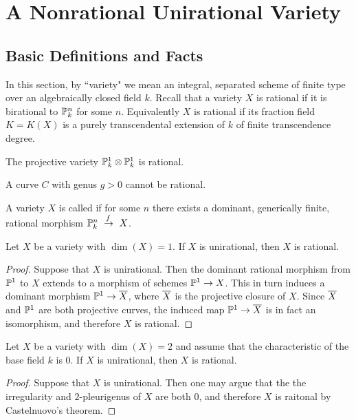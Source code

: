 \section{A Nonrational Unirational Variety}
\subsection{Basic Definitions and Facts}
In this section, by ``variety" we mean an integral, separated scheme of finite type over an algebraically closed field $k$.  Recall that a variety $X$ is rational if it is birational to $\mathbb{P}^n_k$ for some $n$.  Equivalently $X$ is rational if its fraction field $K = K(X)$ is a purely transcendental extension of $k$ of finite transcendence degree.
\begin{ex}
The projective variety $\mathbb{P}^1_k\otimes\mathbb{P}^1_k$ is rational.
\end{ex}
\begin{ex}
A curve $C$ with genus $g>0$ cannot be rational.
\end{ex}

\begin{defn}
A variety $X$ is called  if for some $n$ there exists a dominant, generically finite, rational morphism $\bbp^n_k\xdashrightarrow{f}X$.
\end{defn}

\begin{thm}
Let $X$ be a variety with $\dim(X) = 1$.  If $X$ is unirational, then $X$ is rational.
\end{thm}
\begin{proof}
Suppose that $X$ is unirational.  Then the dominant rational morphism from $\mathbb{P}^1$ to $X$ extends to a morphism of schemes $\mathbb{P}^1\rightarrow X$.  This in turn induces a dominant morphism $\mathbb{P}^1\rightarrow \overline{X}$, where $\overline{X}$ is the projective closure of $X$.  Since $\overline{X}$ and $\mathbb{P}^1$ are both projective curves, the induced map $\mathbb{P}^1\rightarrow \overline{X}$ is in fact an isomorphism, and therefore $X$ is rational.
\end{proof}

\begin{thm}
Let $X$ be a variety with $\dim(X) = 2$ and assume that the characteristic of the base field $k$ is $0$.  If $X$ is unirational, then $X$ is rational.
\end{thm}
\begin{proof}
Suppose that $X$ is unirational.  Then one may argue that the the irregularity and $2$-pleurigenus of $X$ are both $0$, and therefore $X$ is raitonal by Castelnuovo's theorem.
\end{proof}

